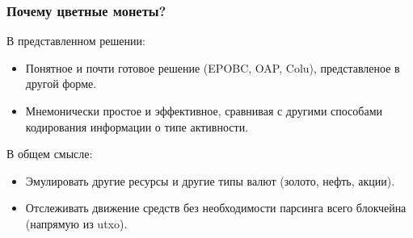 \documentclass[11pt,handout,pdf,hyperref={unicode}]{beamer}
\newcommand{\backupend}{
   \setcounter{framenumber}{\value{finalframe}}
}
\begin{document}
\begin{frame}
  \frametitle{Почему цветные монеты? }

  В представленном решении:
  \begin{itemize}
  \item Понятное и почти готовое решение (EPOBC, OAP, Colu),
    представленое в другой форме.
  \item Мнемонически простое и эффективное, сравнивая с другими
    способами кодирования информации о типе активности.
  \end{itemize}

  В общем смысле:
  \begin{itemize}
  \item Эмулировать другие ресурсы и другие типы валют (золото, нефть,
    акции).
  \item Отслеживать движение средств без необходимости парсинга всего
    блокчейна (напрямую из utxo).
  \end{itemize}
\end{frame}

\backupend
\end{document}
